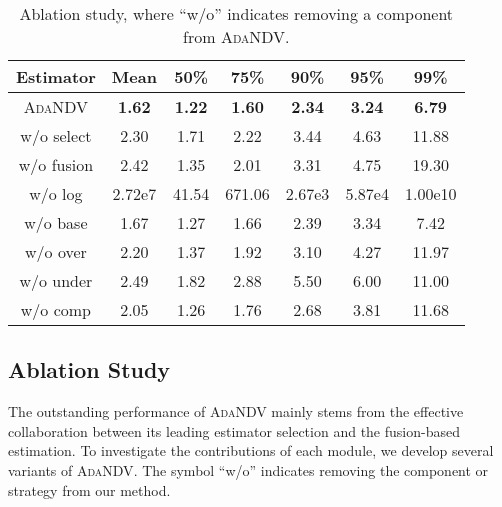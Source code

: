 \begin{table}[t]
    \centering
    \caption{Ablation study, where ``{w/o}'' indicates removing a component from \textsc{AdaNDV}.}
    \begin{tabular}{ccccccc}
\toprule
        Estimator& Mean & 50\% & 75\%& 90\% & 95\% & 99\% \\
\midrule
         \textsc{AdaNDV} & {\textbf{1.62}} & {\textbf{1.22}}& {\textbf{1.60}} & {\textbf{2.34}} & {\textbf{3.24}} & {\textbf{6.79}} \\
        w/o select  & {2.30} & {1.71} & {2.22} & {3.44} & {4.63} & {11.88
} \\ 
        w/o fusion  &  {2.42} & {1.35} & {2.01} & {3.31} & {4.75} & {19.30} \\
\midrule
        {w/o} log & 2.72e7 &  {41.54}& {671.06} & {2.67e3} & {5.87e4}  & 1.00e10 \\
         {w/o} base & {1.67}  & {1.27}  & {1.66} & {2.39}  & {3.34}  & {7.42}  \\
         {w/o} over & {2.20} & {1.37} & {1.92} & {3.10} & {4.27} & {11.97} \\
         {w/o} under & {2.49} & {1.82} & {2.88} & {5.50} & 6.00 & 11.00  \\
         {w/o} comp & {2.05} & 1.26 & 1.76 & {2.68} & {3.81} & {11.68} \\
\bottomrule
    \end{tabular}
    \label{tab:ablation}
\end{table}























\subsection{Ablation Study}
\label{sec:exp-ablation}
The outstanding performance of \textsc{AdaNDV} mainly stems from the effective collaboration between its leading estimator selection and the fusion-based estimation.
To investigate the contributions of each module, we develop several variants of \textsc{AdaNDV}. The symbol ``{w/o}'' indicates removing the component or strategy from our method.


